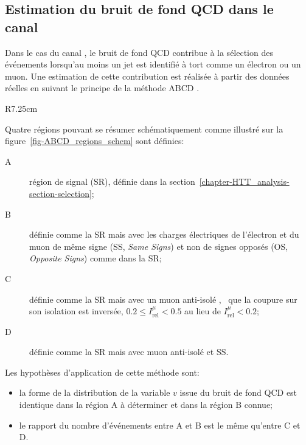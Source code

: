 \subsection{Estimation du bruit de fond QCD dans le canal \ele\mu}\label{chapter-HTT_analysis-section-bg_estimation-QCD-SS}
Dans le cas du canal \ele\mu, le bruit de fond QCD contribue à la sélection des événements lorsqu'au moins un jet est identifié à tort comme un électron ou un muon.
Une estimation de cette contribution est réalisée à partir des données réelles en suivant le principe de la méthode \og ABCD \fg.
\begin{wrapfigure}{R}{7.25cm}
\centering
{}
\caption{Définition schématique des régions A, B, C et D pour l'estimation du bruit de fond QCD.}
\label{fig-ABCD_regions_schem}
\end{wrapfigure}
\par
Quatre régions pouvant se résumer schématiquement comme illustré sur la figure~\ref{fig-ABCD_regions_schem} sont définies:
\begin{description}
\item[A] région de signal (SR), définie dans la section~\ref{chapter-HTT_analysis-section-selection};
\item[B] définie comme la SR mais avec les charges électriques de l'électron et du muon de même signe (SS, \emph{Same Signs}) et non de signes opposés (OS, \emph{Opposite Signs}) comme dans la SR;
\item[C] définie comme la SR mais avec un muon \og anti-isolé \fg{}, \ie\ que la coupure sur son isolation est inversée, $\num{0.2}\leq I_\text{rel}^{\mu} < \num{0.5}$ au lieu de $I_\text{rel}^{\mu} < \num{0.2}$;
\item[D] définie comme la SR mais avec muon anti-isolé et SS.
\end{description}
Les hypothèses d'application de cette méthode sont:
\begin{itemize}
\item la forme de la distribution de la variable $v$ issue du bruit de fond QCD est identique dans la région A à déterminer et dans la région B connue;
\item le rapport du nombre d'événements entre A et B est le même qu'entre C et D.
\end{itemize}
